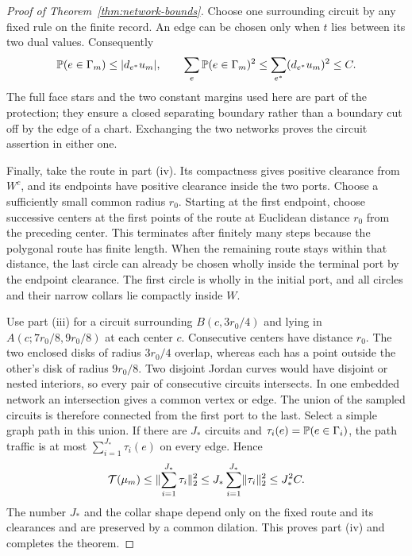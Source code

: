 \begin{proof}[Proof of Theorem~\ref{thm:network-bounds}]
Choose one surrounding circuit by any fixed rule on the finite record.
An edge can be chosen only when \(t\) lies between its two dual values.
Consequently
\[
 \mathbb P(e\in\Gamma_m)\le\lvert d_{e^*}u_m\rvert,
 \qquad
 \sum_e\mathbb P(e\in\Gamma_m)^2
 \le\sum_{e^*}(d_{e^*}u_m)^2\le C.
\]
The full face stars and the two constant margins used here are part of
the protection; they ensure a closed separating boundary rather than a
boundary cut off by the edge of a chart.  Exchanging the two networks
proves the circuit assertion in either one.

Finally, take the route in part (iv).  Its compactness gives positive
clearance from \(W^c\), and its endpoints have positive clearance inside
the two ports.  Choose a sufficiently small common radius \(r_0\).
Starting at the first endpoint, choose successive centers at the first
points of the route at Euclidean distance \(r_0\) from the preceding
center.  This terminates after finitely many steps because the polygonal
route has finite length.  When the remaining route stays within that
distance, the last circle can already be chosen wholly inside the terminal
port by the endpoint clearance.  The first circle is wholly in the
initial port, and all circles and their narrow collars lie compactly
inside \(W\).

Use part (iii) for a circuit surrounding \(B(c,3r_0/4)\) and lying in
\(A(c;7r_0/8,9r_0/8)\) at each center \(c\).  Consecutive centers have
distance \(r_0\).  The two enclosed disks of radius \(3r_0/4\) overlap,
whereas each has a point outside the other's disk of radius \(9r_0/8\).
Two disjoint Jordan curves would have
disjoint or nested interiors, so every pair of consecutive circuits
intersects.  In one embedded network an intersection gives a common
vertex or edge.  The union of the sampled circuits is therefore connected
from the first port to the last.  Select a simple graph path in this
union.  If there are \(J_*\) circuits and
\(\tau_i(e)=\mathbb P(e\in\Gamma_i)\), the path traffic is at most
\(\sum_{i=1}^{J_*}\tau_i(e)\) on every edge.
Hence
\[
 \mathcal T(\mu_m)
 \le\lVert \sum_{i=1}^{J_*}\tau_i\rVert_2^2
 \le J_*\sum_{i=1}^{J_*}\lVert \tau_i\rVert_2^2
 \le J_*^2 C.
\]
The number \(J_*\) and the collar shape depend only on the fixed route and
its clearances and are preserved by a common dilation.  This proves
part (iv) and completes the theorem.
\end{proof}
